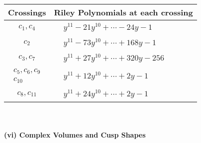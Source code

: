 \documentclass[1p]{elsarticle_modified}
\theoremstyle{definition}
\begin{document}
\begin{tabular}{m{50pt}|m{274pt}}
Crossings & \hspace{64pt}Riley Polynomials at each crossing \\
\hline $$\begin{aligned}c_{1},c_{4}\end{aligned}$$&$\begin{aligned}
&y^{11}-21 y^{10}+\cdots-24 y-1
\end{aligned}$\\
\hline $$\begin{aligned}c_{2}\end{aligned}$$&$\begin{aligned}
&y^{11}-73 y^{10}+\cdots+168 y-1
\end{aligned}$\\
\hline $$\begin{aligned}c_{3},c_{7}\end{aligned}$$&$\begin{aligned}
&y^{11}+27 y^{10}+\cdots+320 y-256
\end{aligned}$\\
\hline $$\begin{aligned}c_{5},c_{6},c_{9}\\c_{10}\end{aligned}$$&$\begin{aligned}
&y^{11}+12 y^{10}+\cdots+2 y-1
\end{aligned}$\\
\hline $$\begin{aligned}c_{8},c_{11}\end{aligned}$$&$\begin{aligned}
&y^{11}+24 y^{10}+\cdots+2 y-1
\end{aligned}$\\
\hline
\end{tabular}\\~\\
\newpage\flushleft \textbf{(vi) Complex Volumes and Cusp Shapes}
\end{document}
